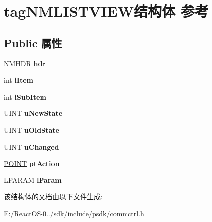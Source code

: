 \hypertarget{structtag_n_m_l_i_s_t_v_i_e_w}{}\section{tag\+N\+M\+L\+I\+S\+T\+V\+I\+E\+W结构体 参考}
\label{structtag_n_m_l_i_s_t_v_i_e_w}
\subsection*{Public 属性}
\begin{DoxyCompactItemize}
\item 
\mbox{\label{structtag_n_m_l_i_s_t_v_i_e_w_a03cab3b64b7a11be536a5d065cded971}} 
\hyperlink{structtag_n_m_h_d_r}{N\+M\+H\+DR} {\bfseries hdr}
\item 
\mbox{\label{structtag_n_m_l_i_s_t_v_i_e_w_a1af138bdf63e8c1fba252aec53f26dcd}} 
int {\bfseries i\+Item}
\item 
\mbox{\label{structtag_n_m_l_i_s_t_v_i_e_w_a20aced191abbc7951de57780f87715b7}} 
int {\bfseries i\+Sub\+Item}
\item 
\mbox{\label{structtag_n_m_l_i_s_t_v_i_e_w_ab5e959c5118703f5a9877f273a1066d8}} 
U\+I\+NT {\bfseries u\+New\+State}
\item 
\mbox{\label{structtag_n_m_l_i_s_t_v_i_e_w_ad8a47717f3e8f0f5e20da743ece81e65}} 
U\+I\+NT {\bfseries u\+Old\+State}
\item 
\mbox{\label{structtag_n_m_l_i_s_t_v_i_e_w_aaca9326981cb20bbf361581c68d9ebb7}} 
U\+I\+NT {\bfseries u\+Changed}
\item 
\mbox{\label{structtag_n_m_l_i_s_t_v_i_e_w_a54b2b80ad64583d86a88baa6c92f9076}} 
\hyperlink{structtag_p_o_i_n_t}{P\+O\+I\+NT} {\bfseries pt\+Action}
\item 
\mbox{\label{structtag_n_m_l_i_s_t_v_i_e_w_ac931f26de7c33efab001050a794653e4}} 
L\+P\+A\+R\+AM {\bfseries l\+Param}
\end{DoxyCompactItemize}


该结构体的文档由以下文件生成\+:\begin{DoxyCompactItemize}
\item 
E\+:/\+React\+O\+S-\/0../sdk/include/psdk/commctrl.\+h\end{DoxyCompactItemize}

